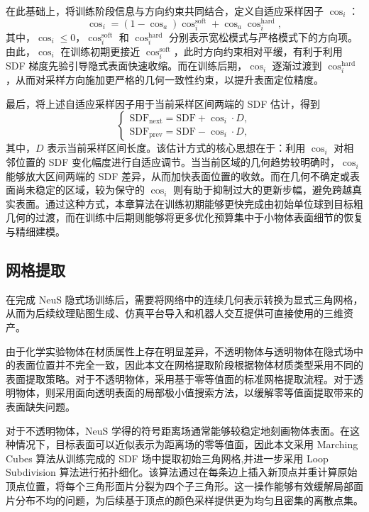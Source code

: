 在此基础上，将训练阶段信息与方向约束共同结合，定义自适应采样因子 $\cos_i$：
\begin{equation}
\cos_i=(1-\cos_a)\cos_i^{\text{soft}}+\cos_a \cos_i^{\text{hard}},
\end{equation}
其中，$\cos_i \leq 0$，$\cos_i^{\text{soft}}$ 和 $\cos_i^{\text{hard}}$ 分别表示宽松模式与严格模式下的方向项。由此，$\cos_i$ 在训练初期更接近 $\cos_i^{\text{soft}}$，此时方向约束相对平缓，有利于利用 SDF 梯度先验引导隐式表面快速收缩。而在训练后期，$\cos_i$ 逐渐过渡到 $\cos_i^{\text{hard}}$，从而对采样方向施加更严格的几何一致性约束，以提升表面定位精度。

最后，将上述自适应采样因子用于当前采样区间两端的 SDF 估计，得到
\begin{equation}
\begin{cases}
    \text{SDF}_{\text{next}} = \text{SDF} + \cos_i \cdot D,\\
    \text{SDF}_{\text{prev}} = \text{SDF} - \cos_i \cdot D,
\end{cases}
\end{equation}
其中，$D$ 表示当前采样区间长度。该估计方式的核心思想在于：利用 $\cos_i$ 对相邻位置的 SDF 变化幅度进行自适应调节。当当前区域的几何趋势较明确时，$\cos_i$ 能够放大区间两端的 SDF 差异，从而加快表面位置的收敛。而在几何不确定或表面尚未稳定的区域，较为保守的 $\cos_i$ 则有助于抑制过大的更新步幅，避免跨越真实表面。通过这种方式，本章算法在训练初期能够更快完成由初始单位球到目标粗几何的过渡，而在训练中后期则能够将更多优化预算集中于小物体表面细节的恢复与精细建模。



\subsection{网格提取}
\label{sec:ch4_mesh_extraction}

在完成 NeuS 隐式场训练后，需要将网络中的连续几何表示转换为显式三角网格，从而为后续纹理贴图生成、仿真平台导入和机器人交互提供可直接使用的三维资产。

由于化学实验物体在材质属性上存在明显差异，不透明物体与透明物体在隐式场中的表面位置并不完全一致，因此本文在网格提取阶段根据物体材质类型采用不同的表面提取策略。对于不透明物体，采用基于零等值面的标准网格提取流程。对于透明物体，则采用面向透明表面的局部极小值搜索方法，以缓解零等值面提取带来的表面缺失问题。

对于不透明物体，NeuS 学得的符号距离场通常能够较稳定地刻画物体表面。在这种情况下，目标表面可以近似表示为距离场的零等值面，因此本文采用 Marching Cubes\cite{lorensen1987marchingcubes} 算法从训练完成的 SDF 场中提取初始三角网格,并进一步采用 Loop Subdivision\cite{loop1987smooth} 算法进行拓扑细化。该算法通过在每条边上插入新顶点并重计算原始顶点位置，将每个三角形面片分裂为四个子三角形。这一操作能够有效缓解局部面片分布不均的问题，为后续基于顶点的颜色采样提供更为均匀且密集的离散点集。

